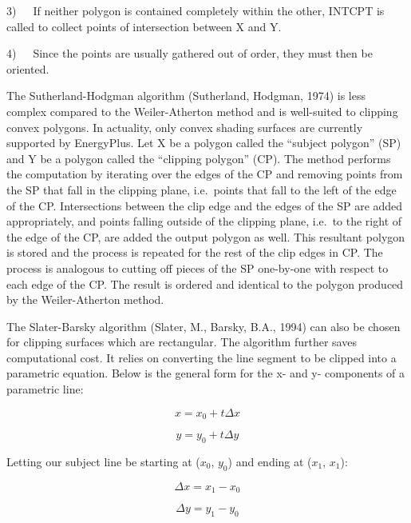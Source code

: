 3)~~~If neither polygon is contained completely within the other, INTCPT is called to collect points of intersection between X and Y.

4)~~~Since the points are usually gathered out of order, they must then be oriented.

The Sutherland-Hodgman algorithm (Sutherland, Hodgman, 1974) is less complex compared to the Weiler-Atherton method and is well-suited to clipping convex polygons. In actuality, only convex shading surfaces are currently supported by EnergyPlus. Let X be a polygon called the ``subject polygon'' (SP) and Y be a polygon called the ``clipping polygon'' (CP). The method performs the computation by iterating over the edges of the CP and removing points from the SP that fall in the clipping plane, i.e.~points that fall to the left of the edge of the CP. Intersections between the clip edge and the edges of the SP are added appropriately, and points falling outside of the clipping plane, i.e.~to the right of the edge of the CP, are added the output polygon as well. This resultant polygon is stored and the process is repeated for the rest of the clip edges in CP. The process is analogous to cutting off pieces of the SP one-by-one with respect to each edge of the CP. The result is ordered and identical to the polygon produced by the Weiler-Atherton method.

The Slater-Barsky algorithm (Slater, M., Barsky, B.A., 1994) can also be chosen for clipping surfaces which are rectangular. The algorithm further saves computational cost. It relies on converting the line segment to be clipped into a parametric equation. Below is the general form for the x- and y- components of a parametric line:

\begin{equation}
x = x_0 + t \Delta x
\end{equation}

\begin{equation}
y = y_0 + t \Delta y
\end{equation}

Letting our subject line be starting at ($x_0$, $y_0$) and ending at ($x_1$, $x_1$):

\begin{equation}
\Delta x = x_1 - x_0
\end{equation}

\begin{equation}
\Delta y = y_1 - y_0
\end{equation}

